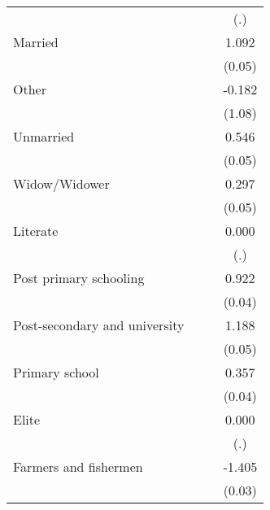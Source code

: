 {\begin{tabular}{l*{3}{c}}
                    &                     &                     &         (.)         \\
Married             &                     &                     &       1.092\sym{***}\\
                    &                     &                     &      (0.05)         \\
Other               &                     &                     &      -0.182         \\
                    &                     &                     &      (1.08)         \\
Unmarried           &                     &                     &       0.546\sym{***}\\
                    &                     &                     &      (0.05)         \\
Widow/Widower       &                     &                     &       0.297\sym{***}\\
                    &                     &                     &      (0.05)         \\
Literate            &                     &                     &       0.000         \\
                    &                     &                     &         (.)         \\
Post primary schooling&                     &                     &       0.922\sym{***}\\
                    &                     &                     &      (0.04)         \\
Post-secondary and university&                     &                     &       1.188\sym{***}\\
                    &                     &                     &      (0.05)         \\
Primary school      &                     &                     &       0.357\sym{***}\\
                    &                     &                     &      (0.04)         \\
Elite               &                     &                     &       0.000         \\
                    &                     &                     &         (.)         \\
Farmers and fishermen&                     &                     &      -1.405\sym{***}\\
                    &                     &                     &      (0.03)         \\

\end{tabular}}
